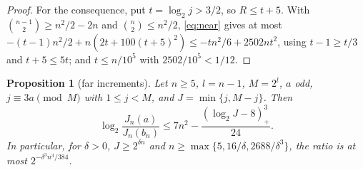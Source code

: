 \documentclass[11pt,a4paper]{article}
\newtheorem{proposition}[theorem]{Proposition}
\theoremstyle{definition}
\begin{document}
\begin{proof}
For the consequence, put $t=\log_2j>3/2$, so $R\le t+5$. With
$\binom{n-1}2\ge n^2/2-2n$ and $\binom n2\le n^2/2$, \eqref{eq:near} gives at
most $-(t-1)n^2/2+n(2t+100(t+5)^2)\le-tn^2/6+2502nt^2$, using $t-1\ge t/3$ and
$t+5\le5t$; and $t\le n/10^5$ with $2502/10^5<1/12$.
\end{proof}

\begin{proposition}[far increments]\label{prop:far}
Let $n\ge5$, $l=n-1$, $M=2^l$, $a$ odd, $j\equiv3a\pmod M$ with $1\le j<M$, and
$J=\min\{j,M-j\}$. Then
\begin{equation}\label{eq:far}
 \log_2\frac{J_n(a)}{J_n(b_n)}\le7n^2-\frac{(\log_2J-8)_+^3}{24}.
\end{equation}
In particular, for $\delta>0$, $J\ge2^{\delta n}$ and
$n\ge\max\{5,16/\delta,2688/\delta^3\}$, the ratio is at most
$2^{-\delta^3n^3/384}$.
\end{proposition}
\end{document}
